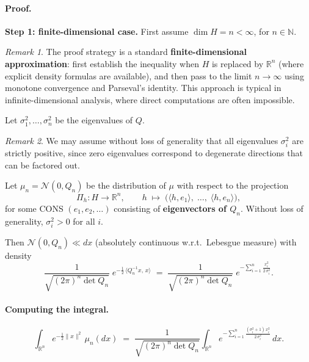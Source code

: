 \documentclass[11pt]{article}
\theoremstyle{definition}
\theoremstyle{remark}
\newtheorem{remark}{Remark}
\begin{document}
\paragraph{Proof.}
\textbf{Step 1: finite-dimensional case.}
First assume $\dim H = n < \infty$, for $n \in \mathbb{N}$.

\begin{remark}
The proof strategy is a standard \textbf{finite-dimensional approximation}: first establish the inequality when $H$ is replaced by $\mathbb{R}^n$ (where explicit density formulas are available), and then pass to the limit $n \to \infty$ using monotone convergence and Parseval's identity.  This approach is typical in infinite-dimensional analysis, where direct computations are often impossible.
\end{remark}

Let $\sigma_1^2, \ldots, \sigma_n^2$ be the eigenvalues of $Q$.
\begin{remark}
We may assume without loss of generality that all eigenvalues $\sigma_i^2$ are strictly positive, since zero eigenvalues correspond to degenerate directions that can be factored out.
\end{remark}

Let $\mu_n = \mathcal{N}(0, Q_n)$ be the distribution of $\mu$ with respect to
the projection
\[
    \Pi_h \colon H \to \mathbb{R}^n,
    \qquad
    h \;\mapsto\; \bigl(\langle h, e_1 \rangle,\; \ldots,\;
                        \langle h, e_n \rangle\bigr),
\]
for some CONS $(e_1, e_2, \ldots)$ consisting of
\textbf{eigenvectors of $Q_n$}.
Without loss of generality, $\sigma_i^2 > 0$ for all $i$.

Then $\mathcal{N}(0, Q_n) \ll dx$ (absolutely continuous w.r.t.\ Lebesgue measure)
with density
\[
    \frac{1}{\sqrt{(2\pi)^n \det Q_n}}\;
    e^{-\frac{1}{2}\,\langle Q_n^{-1} x,\, x \rangle}
    \;=\;
    \frac{1}{\sqrt{(2\pi)^n \det Q_n}}\;
    e^{-\sum_{i=1}^{n} \frac{x_i^2}{2\,\sigma_i^2}}.
\]

\paragraph{Computing the integral.}
\[
    \int_{\mathbb{R}^n} e^{-\frac{1}{2}\|x\|^2}\,\mu_n(dx)
    \;=\;
    \frac{1}{\sqrt{(2\pi)^n \det Q_n}}
    \int_{\mathbb{R}^n}
    e^{-\sum_{i=1}^{n} \frac{(\sigma_i^2 + 1)\,x_i^2}
                              {2\,\sigma_i^2}}\,dx.
\]
\end{document}
